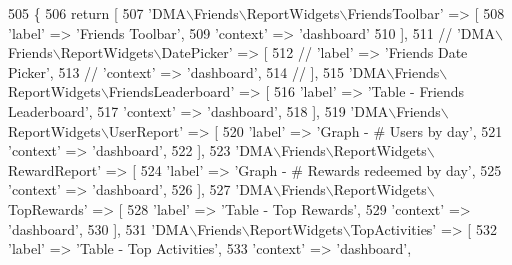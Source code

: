 \begin{DoxyCode}
505     \{   
506         \textcolor{keywordflow}{return} [
507             \textcolor{stringliteral}{'DMA\(\backslash\)Friends\(\backslash\)ReportWidgets\(\backslash\)FriendsToolbar'} => [
508                 \textcolor{stringliteral}{'label'}     => \textcolor{stringliteral}{'Friends Toolbar'},
509                 \textcolor{stringliteral}{'context'}   => \textcolor{stringliteral}{'dashboard'}
510             ],
511             \textcolor{comment}{// 'DMA\(\backslash\)Friends\(\backslash\)ReportWidgets\(\backslash\)DatePicker' => [}
512             \textcolor{comment}{//     'label'     => 'Friends Date Picker',}
513             \textcolor{comment}{//     'context'   => 'dashboard',}
514             \textcolor{comment}{// ],}
515             \textcolor{stringliteral}{'DMA\(\backslash\)Friends\(\backslash\)ReportWidgets\(\backslash\)FriendsLeaderboard'} => [
516                 \textcolor{stringliteral}{'label'}     => \textcolor{stringliteral}{'Table - Friends Leaderboard'},
517                 \textcolor{stringliteral}{'context'}   => \textcolor{stringliteral}{'dashboard'},
518             ],
519             \textcolor{stringliteral}{'DMA\(\backslash\)Friends\(\backslash\)ReportWidgets\(\backslash\)UserReport'} => [
520                 \textcolor{stringliteral}{'label'}     => \textcolor{stringliteral}{'Graph - # Users by day'},
521                 \textcolor{stringliteral}{'context'}   => \textcolor{stringliteral}{'dashboard'},
522             ],
523             \textcolor{stringliteral}{'DMA\(\backslash\)Friends\(\backslash\)ReportWidgets\(\backslash\)RewardReport'} => [
524                 \textcolor{stringliteral}{'label'}     => \textcolor{stringliteral}{'Graph - # Rewards redeemed by day'},
525                 \textcolor{stringliteral}{'context'}   => \textcolor{stringliteral}{'dashboard'},
526             ],
527             \textcolor{stringliteral}{'DMA\(\backslash\)Friends\(\backslash\)ReportWidgets\(\backslash\)TopRewards'} => [
528                 \textcolor{stringliteral}{'label'}     => \textcolor{stringliteral}{'Table - Top Rewards'},
529                 \textcolor{stringliteral}{'context'}   => \textcolor{stringliteral}{'dashboard'},
530             ],
531             \textcolor{stringliteral}{'DMA\(\backslash\)Friends\(\backslash\)ReportWidgets\(\backslash\)TopActivities'} => [
532                 \textcolor{stringliteral}{'label'}     => \textcolor{stringliteral}{'Table - Top Activities'},
533                 \textcolor{stringliteral}{'context'}   => \textcolor{stringliteral}{'dashboard'},

\end{DoxyCode}
